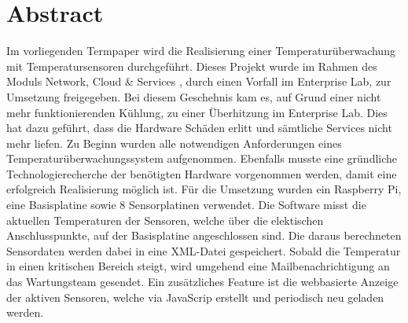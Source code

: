 \section*{Abstract}
Im vorliegenden Termpaper wird die Realisierung einer Temperaturüberwachung mit Temperatursensoren durchgeführt. Dieses Projekt  wurde im Rahmen des Moduls \grqq{}Network, Cloud \& Services\glqq{} , durch einen Vorfall im Enterprise Lab, zur Umsetzung freigegeben. Bei diesem Geschehnis kam es, auf Grund einer nicht mehr funktionierenden Kühlung, zu einer Überhitzung im Enterprise Lab. Dies hat dazu geführt, dass die Hardware Schäden erlitt und sämtliche Services nicht mehr liefen.
Zu Beginn wurden alle notwendigen Anforderungen eines Temperaturüberwachungssystem aufgenommen. Ebenfalls musste eine gründliche Technologierecherche der benötigten Hardware vorgenommen werden, damit eine erfolgreich Realisierung möglich ist.
Für die Umsetzung wurden ein Raspberry Pi, eine Basisplatine sowie 8 Sensorplatinen verwendet. Die Software misst die aktuellen Temperaturen der Sensoren, welche über die elektischen Anschlusspunkte, auf der Basisplatine angeschlossen sind. Die daraus berechneten Sensordaten werden dabei in eine XML-Datei gespeichert. Sobald die Temperatur in einen kritischen Bereich steigt, wird umgehend eine Mailbenachrichtigung an das Wartungsteam gesendet. Ein zusätzliches Feature ist die webbasierte Anzeige der aktiven Sensoren, welche via JavaScrip erstellt und periodisch neu geladen werden.
 
\clearpage
